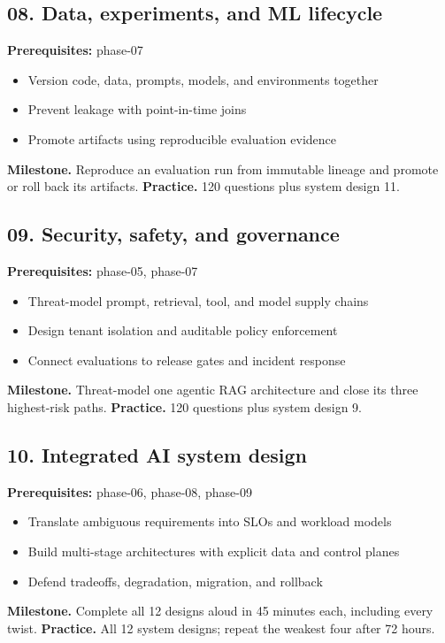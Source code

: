 \subsection{08. Data, experiments, and ML lifecycle}
 \quad \textbf{Prerequisites:} phase-07
\begin{itemize}
\item Version code, data, prompts, models, and environments together
\item Prevent leakage with point-in-time joins
\item Promote artifacts using reproducible evaluation evidence
\end{itemize}
\textbf{Milestone.} Reproduce an evaluation run from immutable lineage and promote or roll back its artifacts.
\textbf{Practice.} 120 questions plus system design 11.
\subsection{09. Security, safety, and governance}
 \quad \textbf{Prerequisites:} phase-05, phase-07
\begin{itemize}
\item Threat-model prompt, retrieval, tool, and model supply chains
\item Design tenant isolation and auditable policy enforcement
\item Connect evaluations to release gates and incident response
\end{itemize}
\textbf{Milestone.} Threat-model one agentic RAG architecture and close its three highest-risk paths.
\textbf{Practice.} 120 questions plus system design 9.
\subsection{10. Integrated AI system design}
 \quad \textbf{Prerequisites:} phase-06, phase-08, phase-09
\begin{itemize}
\item Translate ambiguous requirements into SLOs and workload models
\item Build multi-stage architectures with explicit data and control planes
\item Defend tradeoffs, degradation, migration, and rollback
\end{itemize}
\textbf{Milestone.} Complete all 12 designs aloud in 45 minutes each, including every twist.
\textbf{Practice.} All 12 system designs; repeat the weakest four after 72 hours.
